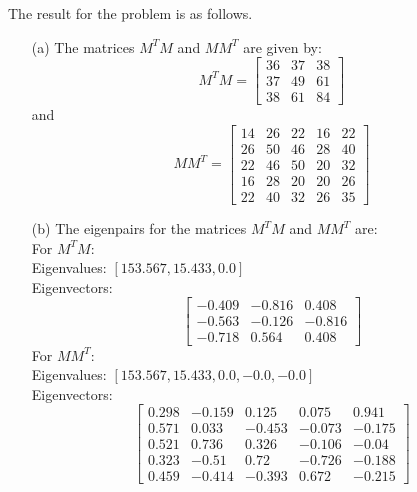 \documentclass{article}
\begin{document}
The result for the problem is as follows.
\begin{enumerate}
    \item[(a)] The matrices \( M^T M \) and \( M M^T \) are given by:
    \[
    M^T M = \begin{bmatrix}
        36 & 37 & 38 \\
        37 & 49 & 61 \\
        38 & 61 & 84
    \end{bmatrix}
    \]
    and
    \[
    M M^T = \begin{bmatrix}
        14 & 26 & 22 & 16 & 22 \\
        26 & 50 & 46 & 28 & 40 \\
        22 & 46 & 50 & 20 & 32 \\
        16 & 28 & 20 & 20 & 26 \\
        22 & 40 & 32 & 26 & 35
    \end{bmatrix}
    \]

    \item[(b)] The eigenpairs for the matrices \( M^T M \) and \( M M^T \) are:\\
    For \( M^T M \):\\
    Eigenvalues: \( [153.567,  15.433,   0.0] \)\\
    Eigenvectors:
    \[
    \begin{bmatrix}
        -0.409 & -0.816 & 0.408 \\
        -0.563 & -0.126 & -0.816 \\
        -0.718 & 0.564  & 0.408
    \end{bmatrix}
    \]
    For \( M M^T \):\\
    Eigenvalues: \( [153.567,  15.433,   0.0,   -0.0,   -0.0] \)\\
    Eigenvectors:
    \[
    \begin{bmatrix}
     0.298 & -0.159 & 0.125 & 0.075 & 0.941 \\
    0.571 & 0.033 & -0.453 & -0.073 & -0.175 \\
    0.521 & 0.736 & 0.326 & -0.106 & -0.04 \\
    0.323 & -0.51 & 0.72  & -0.726 & -0.188 \\
    0.459 & -0.414 & -0.393 & 0.672 & -0.215
    \end{bmatrix}
    \]


\end{enumerate}
\end{document}
